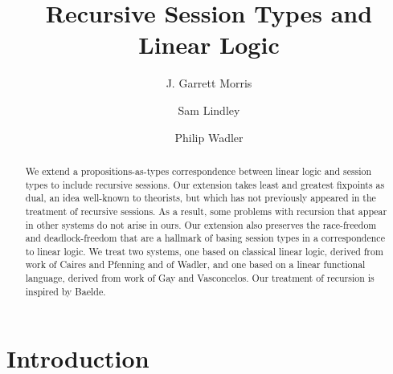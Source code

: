 \documentclass[orivec,envcountsame]{llncs}
\title{Recursive Session Types and Linear Logic}
\author{J. Garrett Morris \and Sam Lindley \and Philip Wadler}
\institute{University of Edinburgh \\
           \email{\{Garrett.Morris,Sam.Lindley\}@ed.ac.uk,wadler@inf.ed.ac.uk}}
\begin{document}
\maketitle

\begin{abstract}
  We extend a propositions-as-types correspondence between linear logic and session types to include
  recursive sessions.  Our extension takes least and greatest fixpoints as dual, an idea well-known
  to theorists, but which has not previously appeared in the treatment of recursive sessions. As a
  result, some problems with recursion that appear in other systems do not arise in ours. Our
  extension also preserves the race-freedom and deadlock-freedom that are a hallmark of basing
  session types in a correspondence to linear logic. We treat two systems, one based on classical
  linear logic, derived from work of Caires and Pfenning and of Wadler, and one based on a
  linear functional language, derived from work of Gay and Vasconcelos. Our treatment of recursion
  is inspired by Baelde.


\end{abstract}

\section{Introduction}\label{sec:intro}
\end{document}
